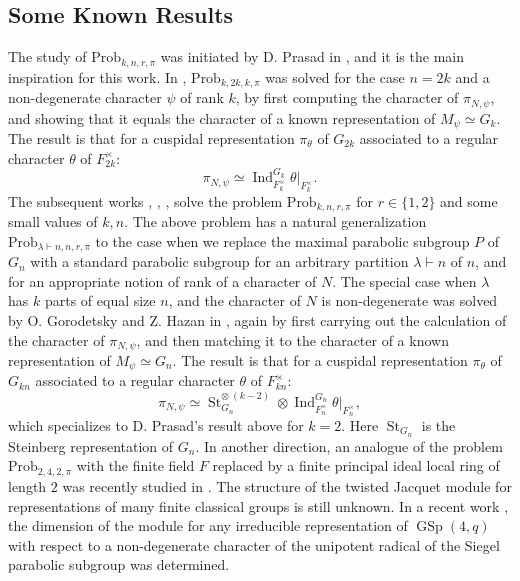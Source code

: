\documentclass[reqno]{amsart}
\theoremstyle{definition}
\theoremstyle{remark}
\numberwithin{equation}{section}
\DeclareMathOperator{\Ind}{Ind}
\DeclareMathOperator{\GSp}{GSp}
\DeclareMathOperator{\St}{St}
\begin{document}
\subsection{Some Known Results} The study of $\text{Prob}_{k,n,r,\pi}$ was initiated by D. Prasad in \cite{Dip[1]}, and it is the main inspiration for this work. In  \cite{Dip[1]},  $\text{Prob}_{k,2k,k,\pi}$ was solved for the case $n=2k$ and a non-degenerate character $\psi$ of rank $k$, by first computing the character of $\pi_{N,\psi}$, and showing that it equals the character of a known representation  of $M_\psi \simeq G_k$. The result is that for a 
 cuspidal representation $\pi_\theta$ of $G_{2k}$ associated to a regular character $\theta$ of $F_{2k}^\times$:
\[ \pi_{N, \psi} \simeq \Ind_{F_k^\times}^{G_k} \theta|_{F_k^\times}. \] 
The subsequent works \cite{KumHim[4]}, \cite{KumHim[2]}, \cite{KumHimgl6rk2},\cite{KumHim[3]} solve the problem $\text{Prob}_{k,n,r,\pi}$ for $r \in \{1,2\}$ and some small values of $k,n$. The above problem has a natural generalization $\text{Prob}_{\lambda \vdash n,n,r,\pi}$ to the case when we replace the  maximal parabolic subgroup $P$ of $G_n$ with a standard parabolic subgroup for an arbitrary partition $\lambda \vdash n$ of $n$, and for an appropriate notion of rank of a character of $N$. The  special case when  $\lambda$ has $k$ parts of  equal size $n$, and the character of $N$ is  non-degenerate was solved by O. Gorodetsky and  Z. Hazan  in  \cite{HazGor}, again by first carrying out the  calculation of the character of $\pi_{N, \psi}$, and then matching it to the character of a known representation of $M_\psi \simeq G_n$.
The result is that for a 
 cuspidal representation $\pi_\theta$ of $G_{kn}$ associated to a regular character $\theta$ of $F_{kn}^\times$:
\[ \pi_{N, \psi} \simeq \St_{G_n}^{\otimes\ (k-2)} \otimes \Ind_{F_n^\times}^{G_n} \theta|_{F_n^\times}, \] 
which specializes to D. Prasad's result above for $k=2$. Here $\St_{G_{n}}$ is the Steinberg representation of $G_n$. In another direction, an analogue of the problem $\text{Prob}_{2,4,2, \pi}$ with the finite field $F$ replaced by a finite principal ideal local ring of length $2$ was recently studied in  \cite{parashar2024degeneratewhittakerspacegl4mathfrako2}. The structure of the twisted Jacquet module for representations of many finite classical groups is still unknown. In a recent work \cite{Jon}, the dimension of the module for any irreducible representation of $\GSp(4,q)$ with respect to a non-degenerate character of the unipotent radical of the Siegel parabolic subgroup was determined.\\
\end{document}
